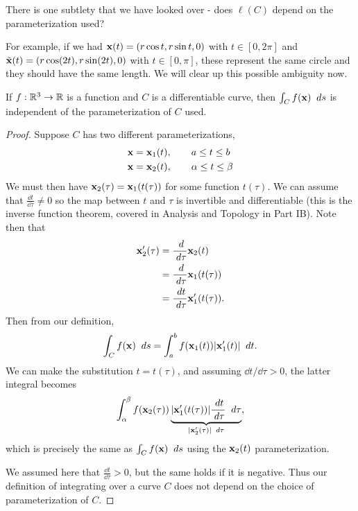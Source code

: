 \documentclass[a4paper]{scrartcl}
\begin{document}
There is one subtlety that we have looked over - does $\ell(C)$ depend on the parameterization used?

For example, if we had $\mathbf{x}(t) = (r \cos t, r \sin t, 0)$ with $t \in [0, 2 \pi]$ and $\tilde{\mathbf{x}}(t) = (r \cos(2 t), r \sin(2 t), 0)$ with $t \in [0, \pi]$, these represent the same circle and they should have the same length. We will clear up this possible ambiguity now.

\begin{proposition}
	If $f:\mathbb{R}^3 \rightarrow \mathbb{R}$ is a function and $C$ is a differentiable curve, then $\int_C f(\mathbf{x}) \; \; d s$ is independent of the parameterization of $C$ used.
\end{proposition}
\begin{proof}
Suppose $C$ has two different parameterizations,
\begin{align*}
	\mathbf{x} &= \mathbf{x}_1(t), \quad \quad a \leq t \leq b \\
	\mathbf{x} &= \mathbf{x}_2(t), \quad \quad \alpha \leq t \leq \beta
\end{align*}
We must then have $\mathbf{x}_2(\tau) = \mathbf{x}_1(t(\tau))$ for some function $t(\tau)$. We can assume that $\frac{\dd t}{\dd \tau} \neq 0$ so the map between $t$ and $\tau$ is invertible and differentiable (this is the inverse function theorem, covered in Analysis and Topology in Part IB). Note then that 
\begin{align*}
	\mathbf{x}'_2(\tau) &= \frac{\; d}{\; d\tau} \mathbf{x}_2(t) \\
	&= \frac{\; d} {\; d \tau} \mathbf{x}_1(t(\tau)) \\
	&= \frac{\; d t}{\; d \tau} \mathbf{x}_1'(t(\tau)).
\end{align*}
Then from our definition,
$$
\int_C f(\mathbf{x}) \; \; d s = \int_{a}^b f(\mathbf{x}_1(t)) |\mathbf{x}_1'(t)| \; \; d t.
$$
We can make the substitution $t = t(\tau)$, and assuming $\dd t/\dd\tau > 0$, the latter integral becomes
$$
\int_\alpha^\beta f(\mathbf{x}_2(\tau)) \underbrace{|\mathbf{x}_1'(t(\tau))| \frac{\; d t}{\; d \tau} \;\; d \tau}_{|\mathbf{x}'_2 (\tau)| \; \; d\tau},
$$
which is precisely the same as $\int_C f(\mathbf{x}) \; \; d s$ using the $\mathbf{x}_2(t)$ parameterization. 

We assumed here that $\frac{\dd t}{\dd \tau} > 0$, but the same holds if it is negative. Thus our definition of integrating over a curve $C$ does not depend on the choice of parameterization of $C$.
\end{proof}
\end{document}
